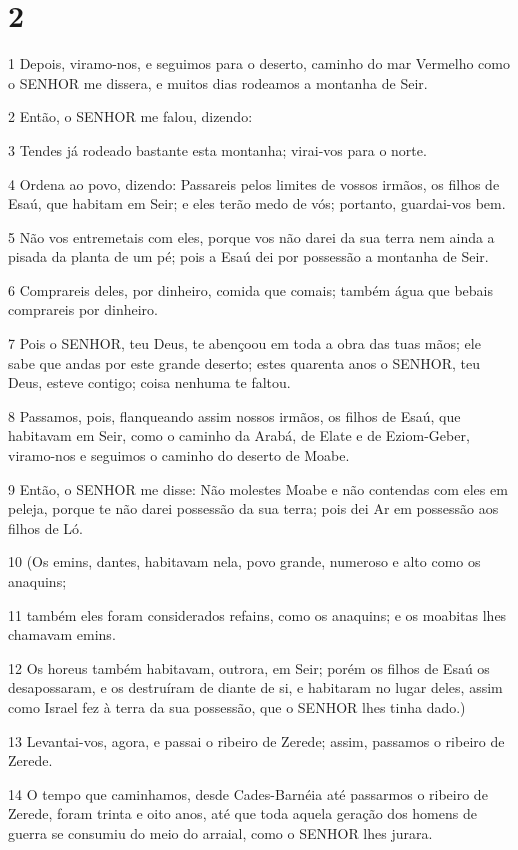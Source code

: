 \chapter{2}

\par 1 Depois, viramo-nos, e seguimos para o deserto, caminho do mar Vermelho como o SENHOR me dissera, e muitos dias rodeamos a montanha de Seir.
\par 2 Então, o SENHOR me falou, dizendo:
\par 3 Tendes já rodeado bastante esta montanha; virai-vos para o norte.
\par 4 Ordena ao povo, dizendo: Passareis pelos limites de vossos irmãos, os filhos de Esaú, que habitam em Seir; e eles terão medo de vós; portanto, guardai-vos bem.
\par 5 Não vos entremetais com eles, porque vos não darei da sua terra nem ainda a pisada da planta de um pé; pois a Esaú dei por possessão a montanha de Seir.
\par 6 Comprareis deles, por dinheiro, comida que comais; também água que bebais comprareis por dinheiro.
\par 7 Pois o SENHOR, teu Deus, te abençoou em toda a obra das tuas mãos; ele sabe que andas por este grande deserto; estes quarenta anos o SENHOR, teu Deus, esteve contigo; coisa nenhuma te faltou.
\par 8 Passamos, pois, flanqueando assim nossos irmãos, os filhos de Esaú, que habitavam em Seir, como o caminho da Arabá, de Elate e de Eziom-Geber, viramo-nos e seguimos o caminho do deserto de Moabe.
\par 9 Então, o SENHOR me disse: Não molestes Moabe e não contendas com eles em peleja, porque te não darei possessão da sua terra; pois dei Ar em possessão aos filhos de Ló.
\par 10 (Os emins, dantes, habitavam nela, povo grande, numeroso e alto como os anaquins;
\par 11 também eles foram considerados refains, como os anaquins; e os moabitas lhes chamavam emins.
\par 12 Os horeus também habitavam, outrora, em Seir; porém os filhos de Esaú os desapossaram, e os destruíram de diante de si, e habitaram no lugar deles, assim como Israel fez à terra da sua possessão, que o SENHOR lhes tinha dado.)
\par 13 Levantai-vos, agora, e passai o ribeiro de Zerede; assim, passamos o ribeiro de Zerede.
\par 14 O tempo que caminhamos, desde Cades-Barnéia até passarmos o ribeiro de Zerede, foram trinta e oito anos, até que toda aquela geração dos homens de guerra se consumiu do meio do arraial, como o SENHOR lhes jurara.
